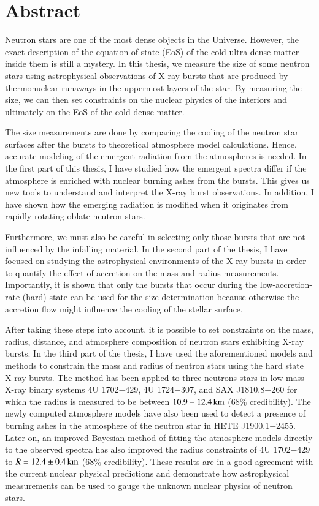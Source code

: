 \chapter*{Abstract}

Neutron stars are one of the most dense objects in the Universe.
However, the exact description of the equation of state (EoS) of the cold ultra-dense matter inside them is still a mystery.
In this thesis, we measure the size of some neutron stars using astrophysical observations of X-ray bursts that are produced by thermonuclear runaways in the uppermost layers of the star.
By measuring the size, we can then set constraints on the nuclear physics of the interiors and ultimately on the EoS of the cold dense matter.

The size measurements are done by comparing the cooling of the neutron star surfaces after the bursts to theoretical atmosphere model calculations.
Hence, accurate modeling of the emergent radiation from the atmospheres is needed.
In the first part of this thesis, I have studied how the emergent spectra differ if the atmosphere is enriched with nuclear burning ashes from the bursts.
This gives us new tools to understand and interpret the X-ray burst observations.
In addition, I have shown how the emerging radiation is modified when it originates from rapidly rotating oblate neutron stars.

Furthermore, we must also be careful in selecting only those bursts that are not influenced by the infalling material.
In the second part of the thesis, I have focused on studying the astrophysical environments of the X-ray bursts in order to quantify the effect of accretion on the mass and radius measurements.
Importantly, it is shown that only the bursts that occur during the low-accretion-rate (hard) state can be used for the size determination because otherwise the accretion flow might influence the cooling of the stellar surface.

After taking these steps into account, it is possible to set constraints on the mass, radius, distance, and atmosphere composition of neutron stars exhibiting X-ray bursts.
In the third part of the thesis, I have used the aforementioned models and methods to constrain the mass and radius of neutron stars using the hard state X-ray bursts.
The method has been applied to three neutrons stars in low-mass X-ray binary systems 4U 1702$-$429, 4U 1724$-$307, and SAX J1810.8$-$260 for which the radius is measured to be between $10.9 - 12.4\, \mathrm{km}$ ($68$\% credibility).
The newly computed atmosphere models have also been used to detect a presence of burning ashes in the atmosphere of the neutron star in HETE J1900.1$-$2455.
Later on, an improved Bayesian method of fitting the atmosphere models directly to the observed spectra has also improved the radius constraints of 4U 1702$-$429 to $R = 12.4 \pm 0.4\, \mathrm{km}$ ($68\%$ credibility). 
These results are in a good agreement with the current nuclear physical predictions and demonstrate how astrophysical measurements can be used to gauge the unknown nuclear physics of neutron stars.


